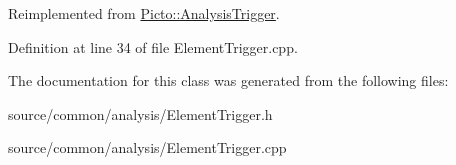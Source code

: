 Reimplemented from \hyperlink{class_picto_1_1_analysis_trigger_a05e5bb8c08c529a59bf996497ac6bdf6}{Picto\-::\-Analysis\-Trigger}.



Definition at line 34 of file Element\-Trigger.\-cpp.



The documentation for this class was generated from the following files\-:\begin{DoxyCompactItemize}
\item 
source/common/analysis/Element\-Trigger.\-h\item 
source/common/analysis/Element\-Trigger.\-cpp\end{DoxyCompactItemize}
